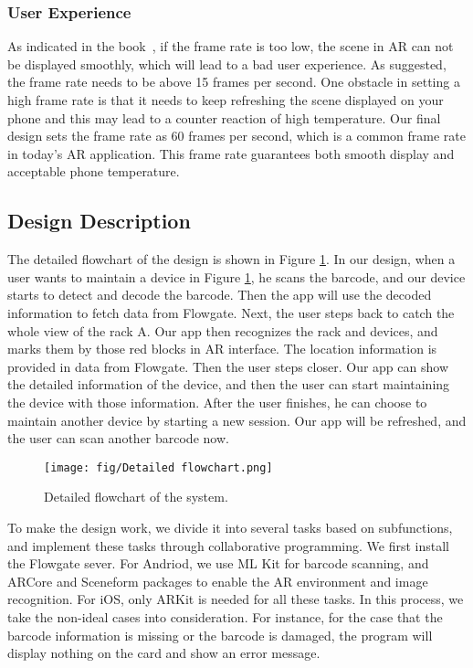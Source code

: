 \documentclass[11pt,a4paper]{article}
\begin{document}
\begin{onehalfspace}
\subsubsection{User Experience}
As indicated in the book~\cite{xjl4}, if the frame rate is too low, the scene in AR can not be displayed smoothly, which will lead to a bad user experience. As suggested, the frame rate needs to be above 15 frames per second. One obstacle in setting a high frame rate is that it needs to keep refreshing the scene displayed on your phone and this may lead to a counter reaction of high temperature. Our final design sets the frame rate as 60 frames per second, which is a common frame rate in today's AR application. This frame rate guarantees both smooth display and acceptable phone temperature.


\subsection{Design Description}
The detailed flowchart of the design is shown in Figure \ref{fig:detail_chart}. In our design, when a user wants to maintain a device in Figure \ref{fig:detail_chart}, he scans the barcode, and our device starts to detect and decode the barcode. Then the app will use the decoded information to fetch data from Flowgate. Next, the user steps back to catch the whole view of the rack A. Our app then recognizes the rack and devices, and marks them by those red blocks in AR interface. The location information is provided in data from Flowgate. Then the user steps closer. Our app can show the detailed information of the device, and then the user can start maintaining the device with those information. After the user finishes, he can choose to maintain another device by starting a new session. Our app will be refreshed, and the user can scan another barcode now. 
\begin{figure}[H]
    \centering
    \texttt{[image: fig/Detailed flowchart.png]}
    \caption{Detailed flowchart of the system.}
    \label{fig:detail_chart}
\end{figure}
To make the design work, we divide it into several tasks based on subfunctions, and implement these tasks through collaborative programming. We first install the Flowgate sever. For Andriod, we use ML Kit for barcode scanning, and ARCore and Sceneform packages to enable the AR environment and image recognition. For iOS, only ARKit is needed for all these tasks. In this process, we take the non-ideal cases into consideration. For instance, for the case that the barcode information is missing or the barcode is damaged, the program will display nothing on the card and show an error message.


\end{onehalfspace}
\end{document}
